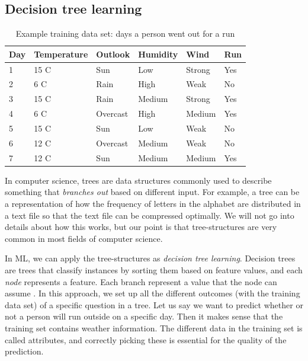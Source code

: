 \subsection{Decision tree learning}
\begin{table}[h]
    \centering
    \begin{tabular}{| l | l | l | l | l | l |}
    \hline
    \textbf{Day} & \textbf{Temperature} & \textbf{Outlook}   & \textbf{Humidity}  & \textbf{Wind}     & \textbf{Run} \\ \hline
            1    & 15 C                 & Sun                & Low                & Strong            & Yes \\
            2    & 6 C                  & Rain               & High               & Weak              & No  \\
            3    & 15 C                 & Rain               & Medium             & Strong            & Yes \\
            4    & 6 C                  & Overcast           & High               & Medium            & Yes \\
            5    & 15 C                 & Sun                & Low                & Weak              & No  \\
            6    & 12 C                 & Overcast           & Medium             & Weak              & No  \\
            7    & 12 C                 & Sun                & Medium             & Medium            & Yes \\
    \hline
    \end{tabular}
    \caption{Example training data set: days a person went out for a run}
    \label{table:days_running}
\end{table}

In computer science, trees are data structures commonly used to describe something that \textit{branches out} based on different input. For example, 
a tree can be a representation of how the frequency of letters in the alphabet are distributed in a text file so that the text file can be compressed optimally. 
We will not go into details about how this works, but our point is that tree-structures are very common in most fields of computer science. 

In ML, we can apply the tree-structures as \textit{decision tree learning}. Decision trees are trees that classify instances by sorting them based on feature values, and each \textit{node} represents a feature. Each branch represent a value that the node can assume \cite{supervised_learning}.
In this approach, we set up all the different outcomes (with the training data set) of a specific question in a tree. Let us say we want to predict whether or not a person will run outside on a specific day. 
Then it makes sense that the training set contains weather information. The different data in the training set is called attributes, and correctly picking 
these is essential for the quality of the prediction.

